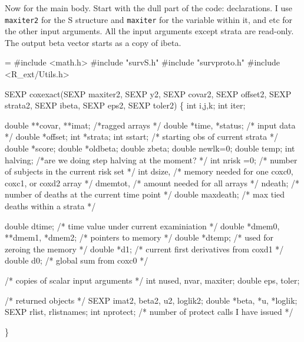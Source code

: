 \documentclass{article}
\begin{document}
Now for the main body.  Start with the dull part of the code:
declarations.
I use \Verb!maxiter2! for the
S structure and \Verb!maxiter! for the variable within it, and
etc for the other input arguments.
All the input arguments except strata are read-only.
The output beta vector starts as a copy of ibeta.
\begin{nwchunk}
=
 #include <math.h>
 #include "survS.h"
 #include "survproto.h"
 #include <R_ext/Utils.h>
 
 
 SEXP coxexact(SEXP maxiter2,  SEXP y2, 
               SEXP covar2,    SEXP offset2, SEXP strata2,
               SEXP ibeta,     SEXP eps2,    SEXP toler2) \{
     int i,j,k;
     int     iter;
     
     double **covar, **imat;  /*ragged arrays */
     double *time, *status;   /* input data */
     double *offset;
     int    *strata;
     int    sstart;   /* starting obs of current strata */
     double *score;
     double *oldbeta;
     double  zbeta;
     double  newlk=0;
     double  temp;
     int     halving;    /*are we doing step halving at the moment? */
     int     nrisk =0;   /* number of subjects in the current risk set */
     int dsize,       /* memory needed for one coxc0, coxc1, or coxd2 array */
         dmemtot,     /* amount needed for all arrays */
         ndeath;      /* number of deaths at the current time point */
     double maxdeath;    /* max tied deaths within a strata */
 
     double dtime;    /* time value under current examiniation */
     double *dmem0, **dmem1, *dmem2; /* pointers to memory */
     double *dtemp;   /* used for zeroing the memory */
     double *d1;     /* current first derivatives from coxd1 */
     double d0;      /* global sum from coxc0 */
         
     /* copies of scalar input arguments */
     int     nused, nvar, maxiter;
     double  eps, toler;
     
     /* returned objects */
     SEXP imat2, beta2, u2, loglik2;
     double *beta, *u, *loglik;
     SEXP rlist, rlistnames;
     int nprotect;  /* number of protect calls I have issued */
     
     \}
\end{nwchunk}
\end{document}
